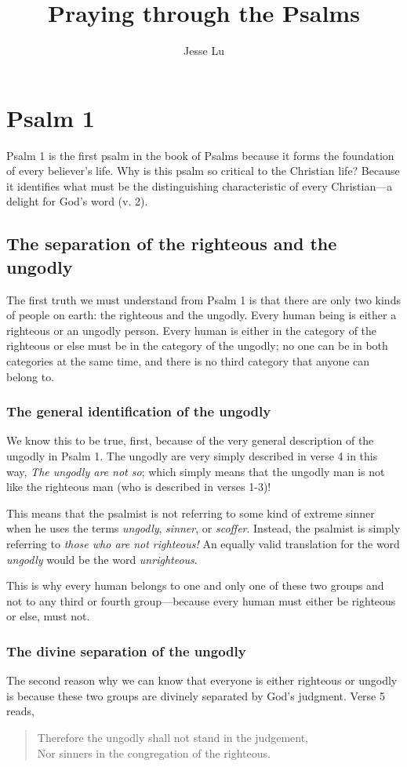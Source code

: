 \documentclass[a5paper]{book}
\title{Praying through the Psalms}
\author{Jesse Lu}
\newcommand{\q}[1]{\textit{#1}}
\newcommand{\Q}[1]{\begin{quote}#1\end{quote}}
\begin{document}
\maketitle
\tableofcontents

\chapter{Psalm 1}
Psalm 1 is the first psalm in the book of Psalms
    because it forms the foundation of every believer's life.
Why is this psalm so critical to the Christian life?
Because it identifies what must be the distinguishing characteristic
    of every Christian---a delight for God's word (v. 2).

\section{The separation of the righteous and the ungodly}
The first truth we must understand from Psalm 1
    is that there are only two kinds of people on earth:
    the righteous and the ungodly.
Every human being is either a righteous or an ungodly person.
Every human is either in the category of the righteous or 
    else must be in the category of the ungodly;
    no one can be in both categories at the same time,
    and there is no third category that anyone can belong to.

\subsection{The general identification of the ungodly}
We know this to be true, first,
    because of the very general description of the ungodly in Psalm 1.
The ungodly are very simply described in verse 4 in this way, 
    \q{The ungodly are not so};
    which simply means that the ungodly man is not like the righteous man
    (who is described in verses 1-3)!

This means that the psalmist is not referring to some kind of extreme sinner
    when he uses the terms \emph{ungodly}, \emph{sinner}, or \emph{scoffer}.
Instead, the psalmist is simply referring to \emph{those who are not righteous!}
An equally valid translation for the word \q{ungodly}
    would be the word \q{unrighteous}.

This is why every human belongs to one and only one of these two groups
    and not to any third or fourth group---because 
    every human must either be righteous or else, must not.

\subsection{The divine separation of the ungodly}
The second reason why we can know that
    everyone is either righteous or ungodly is
    because these two groups are divinely separated by God's judgment.
Verse 5 reads,
    \Q{Therefore the ungodly shall not stand in the judgement, \\
    Nor sinners in the congregation of the righteous.}
\end{document}
